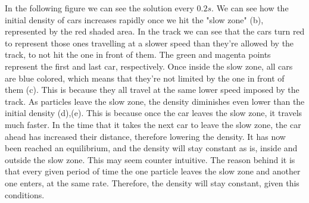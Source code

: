 \begin{questions}

\begin{solution}
In the following figure we can see the solution every $0.2s$. We can see how the initial density of cars increases rapidly once we hit the "slow zone" (b), represented by the red shaded area. In the track we can see that the cars turn red to represent those ones travelling at a slower speed than they're allowed by the track, to not hit the one in front of them. The green and magenta points represent the first and last car, respectively. Once inside the slow zone, all cars are blue colored, which means that they're not limited by the one in front of them (c). This is because they all travel at the same lower speed imposed by the track. As particles leave the slow zone, the density diminishes even lower than the initial density (d),(e). This is because once the car leaves the slow zone, it travels much faster. In the time that it takes the next car to leave the slow zone, the car ahead has increased their distance, therefore lowering the density. It has now been reached an equilibrium, and the density will stay constant as is, inside and outside the slow zone. This may seem counter intuitive. The reason behind it is that every given period of time the one particle leaves the slow zone and another one enters, at the same rate. Therefore, the density will stay constant, given this conditions.


\end{solution}
\end{questions}
